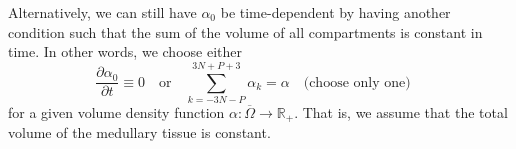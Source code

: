 \documentclass{article}
\begin{document}
Alternatively, we can still have $\alpha_0$ be time-dependent by having another condition such that the sum of the volume of all compartments is constant in time.
In other words, we choose either
\begin{equation}\label{eq:const_vol}
    \frac{\partial \alpha_0}{\partial t} \equiv 0\quad\text{or}\quad\sum_{k=-3N-P}^{3N+P+3} \alpha_k = \alpha\quad\text{(choose only one)}\quad
\end{equation}
    for a given volume density function $\alpha:\overline{\Omega}\to\mathbb{R}_+$.
That is, we assume that the total volume of the medullary tissue is constant.

\end{document}
